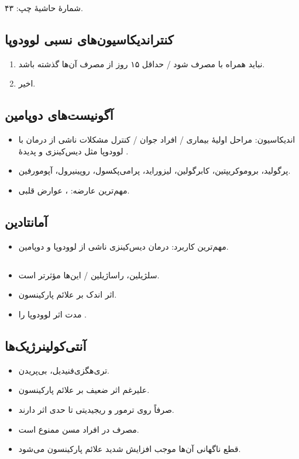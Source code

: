 \documentclass[a4paper,12pt]{extbook}
\begin{document}
\noindent شمارهٔ حاشیهٔ چپ: ۴۳.
\subsection*{کنتراندیکاسیون‌های نسبی لوودوپا}
\begin{enumerate}[label=\alph*)]
\item نباید همراه با  مصرف شود / حداقل ۱۵ روز از مصرف آن‌ها گذشته باشد.
\item {} اخیر.
\end{enumerate}
\subsection*{آگونیست‌های دوپامین}
\begin{itemize}
\item اندیکاسیون: مراحل اولیهٔ بیماری / افراد جوان / کنترل مشکلات ناشی از درمان با لوودوپا مثل دیس‌کینزی و پدیدهٔ .
\item پرگولید، بروموکریپتین، کابرگولین، لیزوراید، پرامی‌پکسول، روپینیرول، آپومورفین.
\item مهم‌ترین عارضه: ، عوارض قلبی.
\end{itemize}
\subsection*{آمانتادین}
\begin{itemize}
\item مهم‌ترین کاربرد: درمان دیس‌کینزی ناشی از لوودوپا و دوپامین.
\end{itemize}
\subsection*{}
\begin{itemize}
\item سلژیلین، راساژیلین / این‌ها مؤثرتر است.
\item اثر اندک بر علائم پارکینسون.
\item مدت اثر لوودوپا را \MDen{$\uparrow$}.
\end{itemize}
\subsection*{آنتی‌کولینرژیک‌ها}
\begin{itemize}
\item تری‌هگزی‌فنیدیل، بی‌پریدن.
\item علیرغم اثر ضعیف بر علائم پارکینسون.
\item صرفاً روی ترمور و ریجیدیتی تا حدی اثر دارند.
\item مصرف در افراد مسن ممنوع است.
\item قطع ناگهانی آن‌ها موجب افزایش شدید علائم پارکینسون می‌شود.
\end{itemize}
\end{document}
